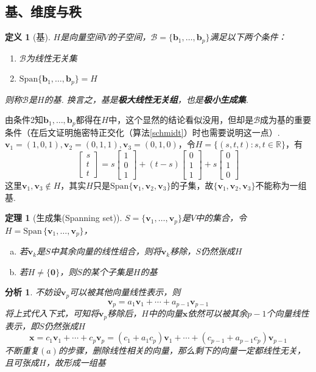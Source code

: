 \documentclass[11pt,UTF8]{ctexart}
\newtheorem{theorem}{定理}
\newtheorem{definition}{定义}
\newtheorem*{analysis}{分析}
\def\vx{\mathbf{x}}
\def\vv{\mathbf{v}}
\def\span{\mathrm{Span}\,}
\newcommand{\vb}[1]{\mathbf{#1}}
\begin{document}
\subsection{基、维度与秩}
\begin{definition}[基]
$H$是向量空间$V$的子空间，$\mathcal{B}=\{\vb{b}_1,\dots,\vb{b}_p\}$满足以下两个条件：
\begin{enumerate}
	\itemsep -3pt
	\item $\mathcal{B}$为线性无关集
	\item $\mathrm{Span}\{\vb{b}_1,\dots,\vb{b}_p\}=H$
\end{enumerate}
则称$\mathcal{B}$是$H$的基. 换言之，基是\textbf{极大线性无关组}，也是\textbf{极小生成集}.
\end{definition}
由条件2知$\vb{b}_1,\dots,\vb{b}_p$都得在$H$中，这个显然的结论看似没用，但却是$\mathcal{B}$成为基的重要条件（在后文证明施密特正交化（算法\ref{schmidt}）时也需要说明这一点）.
$\mathbf{v}_1=(1,0,1),\mathbf{v}_2=(0,1,1),\mathbf{v}_3=(0,1,0)$，令$H=\{(s,t,t):s,t\in \mathbb{R}\}$，有
\[
\begin{bmatrix}s \\t \\t\end{bmatrix}=s\begin{bmatrix}1 \\0 \\1\end{bmatrix}+(t-s)\begin{bmatrix}0 \\1 \\1 \end{bmatrix}+s\begin{bmatrix}0 \\1 \\0 \end{bmatrix}\]
这里$\vv_1,\vv_3\notin H$，其实$H$只是$\mathrm{Span}\{\vv_1,\vv_2,\vv_3\}$的子集，故$\{\vv_1,\vv_2,\vv_3\}$不能称为一组基.
\begin{theorem}[生成集(Spanning set)]
$S=\{\vb{v}_1,\dots,\vb{v}_p\}$是$V$中的集合，令$H=\span\{\vb{v}_1,\dots,\vb{v}_p\}$，
\begin{enumerate}[(a)]
	\itemsep -3pt
	\item 若$\vb{v}_k$是$S$中其余向量的线性组合，则将$\vb{v}_k$移除，$S$仍然张成$H$
	\item 若$H\ne\{\vb{0}\}$，则$S$的某个子集是$H$的基
\end{enumerate}
\end{theorem}
\begin{analysis}不妨设$\vb{v}_p$可以被其他向量线性表示，则
\[\vb{v}_p=a_1\vv_1+\cdots+a_{p-1}\vv_{p-1}\]
将上式代入下式，可知将$\vb{v}_p$移除后，$H$中的向量$\vx$依然可以被其余$p-1$个向量线性表示，即$S$仍然张成$H$
\[\vx=c_1\vv_1+\cdots+c_p\vv_p=(c_1+a_1c_p)\vv_1+\cdots+(c_{p-1}+a_{p-1}c_p)\vv_{p-1}\]
不断重复$(a)$的步骤，删除线性相关的向量，那么剩下的向量一定都线性无关，且可张成$H$，故形成一组基
\end{analysis}
\end{document}
